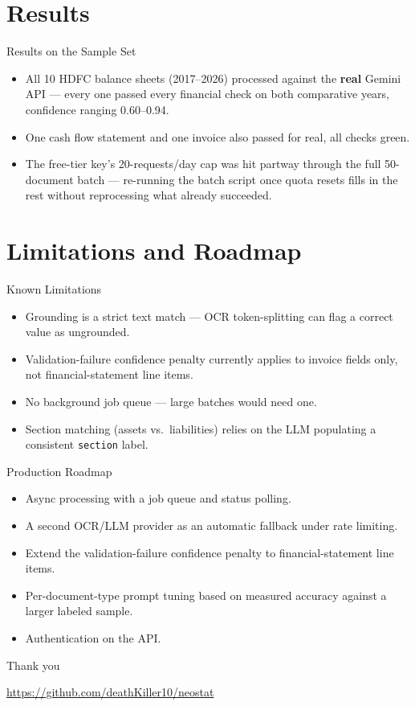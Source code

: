 \documentclass[11pt]{beamer}
\begin{document}
\section{Results}
\begin{frame}{Results on the Sample Set}
  \begin{itemize}
    \item All 10 HDFC balance sheets (2017--2026) processed against the
      \textbf{real} Gemini API --- every one passed every financial check on both
      comparative years, confidence ranging 0.60--0.94.
    \item One cash flow statement and one invoice also passed for real, all checks
      green.
    \item The free-tier key's 20-requests/day cap was hit partway through the full
      50-document batch --- re-running the batch script once quota resets fills in
      the rest without reprocessing what already succeeded.
  \end{itemize}
\end{frame}

\section{Limitations and Roadmap}
\begin{frame}{Known Limitations}
  \begin{itemize}
    \item Grounding is a strict text match --- OCR token-splitting can flag a correct
      value as ungrounded.
    \item Validation-failure confidence penalty currently applies to invoice fields
      only, not financial-statement line items.
    \item No background job queue --- large batches would need one.
    \item Section matching (assets vs.\ liabilities) relies on the LLM populating a
      consistent \texttt{section} label.
  \end{itemize}
\end{frame}

\begin{frame}{Production Roadmap}
  \begin{itemize}
    \item Async processing with a job queue and status polling.
    \item A second OCR/LLM provider as an automatic fallback under rate limiting.
    \item Extend the validation-failure confidence penalty to financial-statement
      line items.
    \item Per-document-type prompt tuning based on measured accuracy against a
      larger labeled sample.
    \item Authentication on the API.
  \end{itemize}
\end{frame}

\begin{frame}
  \centering
  \Large Thank you
  \vspace{1em}

  \normalsize
  \url{https://github.com/deathKiller10/neostat}
\end{frame}
\end{document}
